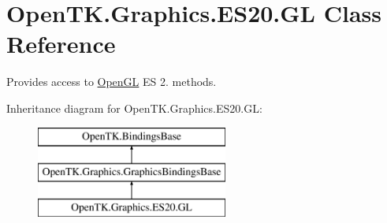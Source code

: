 \hypertarget{class_open_t_k_1_1_graphics_1_1_e_s20_1_1_g_l}{\section{Open\-T\-K.\-Graphics.\-E\-S20.\-G\-L Class Reference}
\label{class_open_t_k_1_1_graphics_1_1_e_s20_1_1_g_l}
}


Provides access to \hyperlink{namespace_open_t_k_1_1_graphics_1_1_open_g_l}{Open\-G\-L} E\-S 2. methods.  


Inheritance diagram for Open\-T\-K.\-Graphics.\-E\-S20.\-G\-L\-:\begin{figure}[H]
\begin{center}
\leavevmode
\includegraphics[height=3.000000cm]{class_open_t_k_1_1_graphics_1_1_e_s20_1_1_g_l}
\end{center}
\end{figure}
